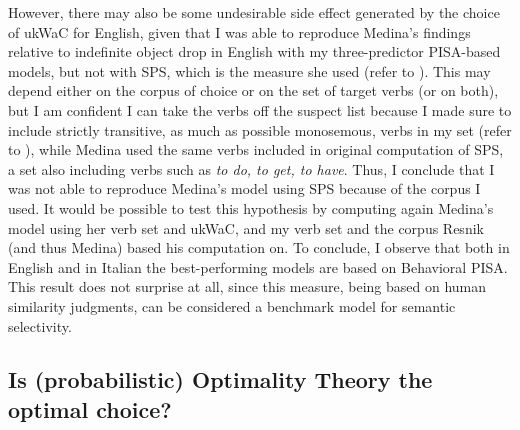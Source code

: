 However, there may also be some undesirable side effect generated by the choice of ukWaC for English, given that I was able to reproduce Medina's findings relative to indefinite object drop in English with my three-predictor PISA-based models, but not with SPS, which is the measure she used (refer to ). This may depend either on the corpus of choice or on the set of target verbs (or on both), but I am confident I can take the verbs off the suspect list because I made sure to include strictly transitive, as much as possible monosemous, verbs in my set (refer to ), while Medina used the same verbs included in  original computation of SPS, a set also including verbs such as \textit{to do, to get, to have}. Thus, I conclude that I was not able to reproduce Medina's model using SPS because of the corpus I used. It would be possible to test this hypothesis by computing again Medina's model using her verb set and ukWaC, and my verb set and the corpus Resnik (and thus Medina) based his computation on. %
To conclude, I observe that both in English and in Italian the best-performing models are based on Behavioral PISA. This result does not surprise at all, since this measure, being based on human similarity judgments, can be considered a benchmark model for semantic selectivity.


\subsection{Is (probabilistic) Optimality Theory the optimal choice?}

